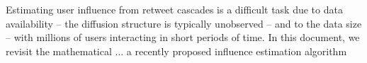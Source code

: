 %
Estimating user influence from retweet cascades is a difficult task due to data availability -- the diffusion structure is typically unobserved -- and to the data size -- with millions of users interacting in short periods of time.
In this document, we revisit the mathematical ... a recently proposed influence estimation algorithm~\citep{Rizoiu2018a}